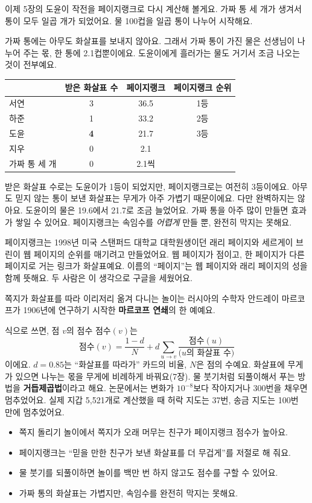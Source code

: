 이제 5장의 도윤이 작전을 페이지랭크로 다시 계산해 볼게요.
가짜 통 세 개가 생겨서 통이 모두 일곱 개가 되었어요.
물 100컵을 일곱 통이 나누어 시작해요.

가짜 통에는 아무도 화살표를 보내지 않아요.
그래서 가짜 통이 가진 물은 선생님이 나누어 주는 몫, 한 통에 2.1컵뿐이에요.
도윤이에게 흘러가는 물도 거기서 조금 나오는 것이 전부예요.

\begin{center}
\small
\begin{tabular}{@{}lccc@{}}
\toprule
& 받은 화살표 수 & 페이지랭크 & 페이지랭크 순위 \\
\midrule
서연 & 3 & 36.5 & 1등 \\
하준 & 1 & 33.2 & 2등 \\
도윤 & \textbf{4} & 21.7 & 3등 \\
지우 & 0 & 2.1 & \\
가짜 통 세 개 & 0 & 2.1씩 & \\
\bottomrule
\end{tabular}
\end{center}

받은 화살표 수로는 도윤이가 1등이 되었지만, 페이지랭크로는 여전히 3등이에요.
아무도 믿지 않는 통이 보낸 화살표는 무게가 아주 가볍기 때문이에요.
다만 완벽하지는 않아요.
도윤이의 물은 19.6에서 21.7로 조금 늘었어요.
가짜 통을 아주 많이 만들면 효과가 쌓일 수 있어요.
페이지랭크는 속임수를 \emph{어렵게} 만들 뿐, 완전히 막지는 못해요.

\begin{deeper}
페이지랭크는 1998년 미국 스탠퍼드 대학교 대학원생이던 래리 페이지와 세르게이 브린이 웹 페이지의 순위를 매기려고 만들었어요.
웹 페이지가 점이고, 한 페이지가 다른 페이지로 거는 링크가 화살표예요.
이름의 “페이지”는 웹 페이지와 래리 페이지의 성을 함께 뜻해요.
두 사람은 이 생각으로 구글을 세웠어요.

쪽지가 화살표를 따라 이리저리 옮겨 다니는 놀이는 러시아의 수학자 안드레이 마르코프가 1906년에 연구하기 시작한 \textbf{마르코프 연쇄}의 한 예예요.

식으로 쓰면, 점 $v$의 점수 $\text{점수}(v)$는
\[
\text{점수}(v) = \frac{1-d}{N} + d \sum_{u \to v} \frac{\text{점수}(u)}{\text{($u$의 화살표 수)}}
\]
이에요. $d=0.85$는 “화살표를 따라가” 카드의 비율, $N$은 점의 수예요.
화살표에 무게가 있으면 나누는 몫을 무게에 비례하게 바꿔요(7장).
물 붓기처럼 되풀이해서 푸는 방법을 \textbf{거듭제곱법}이라고 해요.
논문에서는 변화가 $10^{-8}$보다 작아지거나 300번을 채우면 멈추었어요.
실제 지갑 5,521개로 계산했을 때 허락 지도는 37번, 송금 지도는 100번 만에 멈추었어요.
\end{deeper}

\begin{learned}
\begin{itemize}
\item 쪽지 돌리기 놀이에서 쪽지가 오래 머무는 친구가 페이지랭크 점수가 높아요.
\item 페이지랭크는 “믿을 만한 친구가 보낸 화살표를 더 무겁게”를 저절로 해 줘요.
\item 물 붓기를 되풀이하면 놀이를 백만 번 하지 않고도 점수를 구할 수 있어요.
\item 가짜 통의 화살표는 가볍지만, 속임수를 완전히 막지는 못해요.
\end{itemize}
\end{learned}
